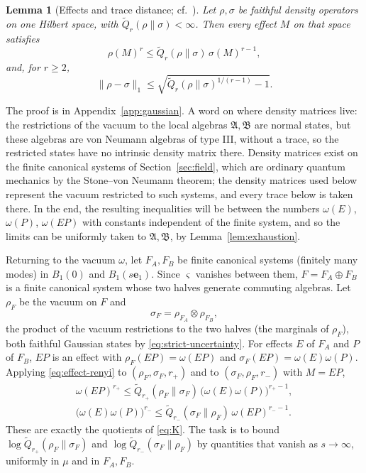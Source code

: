 \documentclass[aps,prl,reprint,longbibliography,raggedbottom]{revtex4-2}
\newtheorem{lemma}{Lemma}
\newcommand{\norm}[1]{\lVert #1\rVert}
\newcommand{\A}{\mathfrak A}
\newcommand{\B}{\mathfrak B}
\newcommand{\Qtil}{\widetilde Q}
\newcommand{\eone}{\mathbf e_1}
\begin{document}
\begin{lemma}[Effects and trace distance; cf.~{\cite{FL13,Beigi13,WWY14,TKRVV10}}]\label{lem:renyi-consequences}
Let $\rho,\sigma$ be faithful density operators on one Hilbert space,
with $\Qtil_r(\rho\|\sigma)<\infty$. Then every effect $M$ on that
space satisfies
\begin{equation}
\rho(M)^r\le\Qtil_r(\rho\|\sigma)\,\sigma(M)^{r-1},
\label{eq:effect-renyi}
\end{equation}
and, for $r\ge2$,
\begin{equation}
\norm{\rho-\sigma}_1\le\sqrt{\Qtil_r(\rho\|\sigma)^{1/(r-1)}-1}.
\label{eq:trace-distance}
\end{equation}
\end{lemma}

The proof is in Appendix~\ref{app:gaussian}. A word on where density
matrices live: the restrictions of the vacuum to the local
algebras $\A,\B$ are normal states, but these algebras are von Neumann
algebras of type III, without a trace, so the restricted states have
no intrinsic density matrix there. Density matrices exist on the
finite canonical systems of Section~\ref{sec:field}, which are
ordinary quantum mechanics by the Stone--von Neumann theorem; the
density matrices used below represent the vacuum restricted to such
systems, and every trace below is taken there. In the end, the resulting inequalities will be between
the numbers $\omega(E)$, $\omega(P)$, $\omega(EP)$ with constants
independent of the finite system, and so the limits can be uniformly taken to $\A,\B$, by
Lemma~\ref{lem:exhaustion}.

Returning to the vacuum
$\omega$, let $F_A,F_B$ be
finite canonical systems (finitely many modes) in $B_1(0)$ and $B_1(s\eone)$. Since
$\varsigma$ vanishes between them, $F=F_A\oplus F_B$ is a finite
canonical system whose two halves generate commuting algebras. Let
$\rho_F$ be the vacuum on $F$ and
\[
\sigma_F=\rho_{F_A}\otimes\rho_{F_B},
\]
the product of the vacuum restrictions to the two halves (the
marginals of $\rho_F$), both faithful Gaussian states by
\eqref{eq:strict-uncertainty}. For effects $E$ of $F_A$ and $P$ of
$F_B$, $EP$ is an effect with $\rho_F(EP)=\omega(EP)$ and
$\sigma_F(EP)=\omega(E)\omega(P)$. Applying
\eqref{eq:effect-renyi} to $(\rho_F,\sigma_F,r_+)$ and to
$(\sigma_F,\rho_F,r_-)$ with $M=EP$,
\begin{equation}
\begin{gathered}
\omega(EP)^{r_+}\le\Qtil_{r_+}(\rho_F\|\sigma_F)\,
\bigl(\omega(E)\omega(P)\bigr)^{r_+-1},\\
\bigl(\omega(E)\omega(P)\bigr)^{r_-}\le\Qtil_{r_-}(\sigma_F\|\rho_F)\,
\omega(EP)^{r_--1}.
\end{gathered}
\label{eq:finite-events}
\end{equation}
These are exactly the quotients of \eqref{eq:K}. The task is to bound
$\log\Qtil_{r_+}(\rho_F\|\sigma_F)$ and
$\log\Qtil_{r_-}(\sigma_F\|\rho_F)$ by quantities that vanish as
$s\to\infty$, uniformly in $\mu$ and in $F_A,F_B$.
\end{document}
